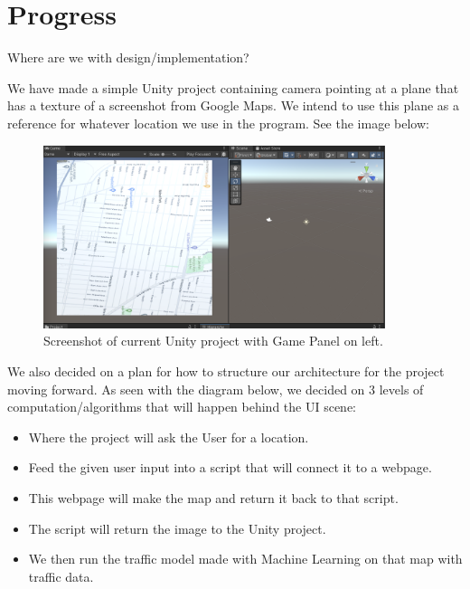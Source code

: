 \section{Progress}

Where are we with design/implementation?

We have made a simple Unity project containing camera pointing at a plane that has a texture of a screenshot from Google Maps. 
We intend to use this plane as a reference for whatever location we use in the program.
See the image below:

\begin{figure}[htb]
    \centering
    \includegraphics[width=10cm]{../Images/ProjectProgress1.png}
       \caption{Screenshot of current Unity project with Game Panel on left.}
           \label{Fig:UnityProject1}
  \end{figure}

\begin{flushleft}
We also decided on a plan for how to structure our architecture for the project moving forward. 
As seen with the diagram below, we decided on 3 levels of computation/algorithms that will happen behind the UI scene:
\begin{itemize}
    \item Where the project will ask the User for a location.
    \item Feed the given user input into a script that will connect it to a webpage.
    \item This webpage will make the map and return it back to that script.
    \item The script will return the image to the Unity project.
    \item We then run the traffic model made with Machine Learning on that map with traffic data. 
 \end{itemize}
\end{flushleft}


